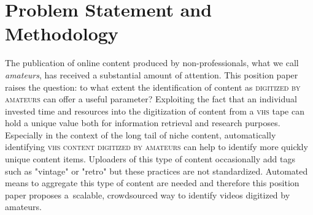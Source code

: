 \documentclass[runningheads,a4paper]{llncs}
\begin{document}
\section{Problem Statement and Methodology}
\vspace{-.7em}
The publication of online content produced by non-professionals,
what we call \emph{amateurs},
has received a substantial amount of attention.
This position paper raises the question: to what extent
the identification of content as {\scshape digitized by amateurs} can offer a useful parameter?
Exploiting the fact that an individual invested time and resources into the
digitization of content from a {\scshape vhs} tape can hold a unique value
both for information retrieval and research purposes.
Especially in the context of the long tail of niche content,
automatically identifying {\scshape vhs content digitized by amateurs}
can help to identify more quickly unique content items.
Uploaders of this type of content occasionally add tags
such as "vintage" or "retro" but these practices are not standardized.
Automated means to aggregate this type of content are needed
and therefore this position paper proposes a~scalable, crowdsourced way
to identify videos digitized by amateurs.
\end{document}
